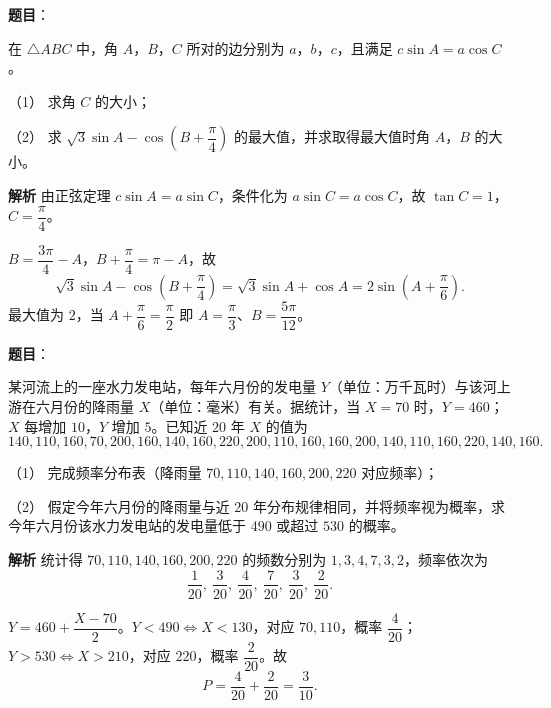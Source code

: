 \begin{answer}

\textbf{题目}：

在 $\triangle ABC$ 中，角 $A$，$B$，$C$ 所对的边分别为 $a$，$b$，$c$，且满足 $c\sin A=a\cos C$。

（1） 求角 $C$ 的大小；

（2） 求 $\sqrt3\sin A-\cos\left(B+\dfrac\pi4\right)$ 的最大值，并求取得最大值时角 $A$，$B$ 的大小。

\textbf{解析}
由正弦定理 $c\sin A=a\sin C$，条件化为 $a\sin C=a\cos C$，故 $\tan C=1$，$C=\dfrac\pi4$。

$B=\dfrac{3\pi}4-A$，$B+\dfrac\pi4=\pi-A$，故
\nopagebreak[4]
\[\sqrt3\sin A-\cos\left(B+\frac\pi4\right)=\sqrt3\sin A+\cos A=2\sin\left(A+\frac\pi6\right).\]
最大值为 $2$，当 $A+\dfrac\pi6=\dfrac\pi2$ 即 $A=\dfrac\pi3$、$B=\dfrac{5\pi}{12}$。



\end{answer}
\begin{answer}

\textbf{题目}：

某河流上的一座水力发电站，每年六月份的发电量 $Y$（单位：万千瓦时）与该河上游在六月份的降雨量 $X$（单位：毫米）有关。据统计，当 $X=70$ 时，$Y=460$；$X$ 每增加 $10$，$Y$ 增加 $5$。已知近 $20$ 年 $X$ 的值为
\nopagebreak[4]
\[140,110,160,70,200,160,140,160,220,200,110,160,160,200,140,110,160,220,140,160.\]

（1） 完成频率分布表（降雨量 $70,110,140,160,200,220$ 对应频率）；

（2） 假定今年六月份的降雨量与近 $20$ 年分布规律相同，并将频率视为概率，求今年六月份该水力发电站的发电量低于 $490$ 或超过 $530$ 的概率。

\textbf{解析}
统计得 $70,110,140,160,200,220$ 的频数分别为 $1,3,4,7,3,2$，频率依次为
\nopagebreak[4]
\[\frac1{20},\ \frac3{20},\ \frac4{20},\ \frac7{20},\ \frac3{20},\ \frac2{20}.\]

$Y=460+\dfrac{X-70}{2}$。$Y<490\iff X<130$，对应 $70,110$，概率 $\dfrac4{20}$；$Y>530\iff X>210$，对应 $220$，概率 $\dfrac2{20}$。故
\nopagebreak[4]
\[P=\frac4{20}+\frac2{20}=\frac3{10}.\]



\end{answer}
